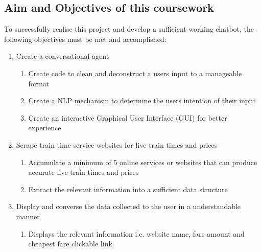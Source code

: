 
\subsection{Aim and Objectives of this coursework}\label{Sec: Aim and Objs}
To successfully realise this project and develop a sufficient working chatbot, the following objectives must be met and accomplished: 
\begin{enumerate}
    \item Create a conversational agent
        \begin{enumerate}
            \item Create code to clean and deconstruct a users input to a manageable format
            \item Create a NLP mechanism to determine the users intention of their input 
            \item Create an interactive Graphical User Interface (GUI) for better experience
        \end{enumerate}

    \item Scrape train time service websites for live train times and prices
        \begin{enumerate}
            \item Accumulate a minimum of 5 online services or websites that can produce accurate live train times and prices
            \item Extract the relevant information into a sufficient data structure
        \end{enumerate}

    \item Display and converse the data collected to the user in a understandable manner
        \begin{enumerate}
            \item Displays the relevant information i.e. website name, fare amount and cheapest fare clickable link. 
        \end{enumerate}


\end{enumerate}
